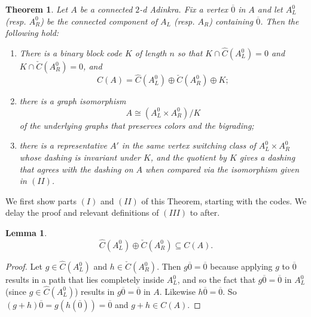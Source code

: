 \documentclass[12pt,twoside,singlespace]{article}
\numberwithin{equation}{section}
\newtheorem{thm}[equation]{Theorem}
\newtheorem{lem}[equation]{Lemma}
\theoremstyle{definition}
\begin{document}
\begin{thm}
\label{thm:quotient}
Let $A$ be a connected $2$-d Adinkra.  Fix a vertex $\overline{0}$ in $A$ and let $A_L^0$ (resp. $A_R^0$) be the connected component of $A_L$ (resp. $A_R$) containing $\overline{0}$. Then the following hold:
\begin{enumerate}
\item[I] There is a binary block code $K$ of length $n$ so that $K\cap \hat{C}(A_L^0)=0$ and $K\cap \check{C}(A_R^0)=0$, and
\[C(A)=\hat{C}(A_L^0)\oplus \check{C}(A_R^0)\oplus K;\]
\item[II] there is a graph isomorphism
\begin{equation}
\label{eqn:quotientiso}
A\cong (A_L^0\times A_R^0)/K
\end{equation}
of the underlying graphs that preserves colors and the bigrading;
\item[III] there is a representative $A'$ in the same vertex switching class of $A_L^0\times A_R^0$ whose dashing is invariant under $K$, and the quotient by $K$ gives a dashing that agrees with the dashing on $A$ when compared via the isomorphism given in $(II)$. 
\end{enumerate}
\end{thm}

We first show parts $(I)$ and $(II)$ of this Theorem, starting with the codes. We delay the proof and relevant definitions of $(III)$ to after.

\begin{lem}
\label{lem:cplus}
\[\hat{C}(A_L^0)\oplus \check{C}(A_R^0) \subseteq C(A).\]
\end{lem}
\begin{proof}
Let $g\in\hat{C}(A_L^0)$ and $h\in \check{C}(A_R^0)$.  Then $g\overline{0}=\overline{0}$ because applying $g$ to $\overline{0}$ results in a path that lies completely inside $A_L^0$, and so the fact that $g\overline{0}=\overline{0}$ in $A_L^0$ (since $g\in \hat{C}(A_L^0)$) results in $g\overline{0}=\overline{0}$ in $A$.  Likewise $h\overline{0}=\overline{0}$.  So $(g+h)\overline{0}=g(h(\overline{0}))=\overline{0}$ and $g+h\in C(A)$.
\end{proof}
\end{document}
